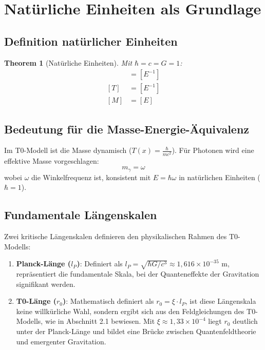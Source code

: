 \documentclass[12pt,a4paper]{article}
\newcommand{\Tfield}{T(x)}
\newtheorem{theorem}{Theorem}[section]
\begin{document}
	\section{Natürliche Einheiten als Grundlage}
	\subsection{Definition natürlicher Einheiten}
	\begin{theorem}[Natürliche Einheiten]
		Mit \(\hbar = c = G = 1\):
		\begin{align}
			[L] &= [E^{-1}] \\
			[T] &= [E^{-1}] \\
			[M] &= [E]
		\end{align}
	\end{theorem}
	
	\subsection{Bedeutung für die Masse-Energie-Äquivalenz}
	Im T0-Modell ist die Masse dynamisch (\(\Tfield = \frac{\hbar}{m c^2}\)). Für Photonen wird eine effektive Masse vorgeschlagen:
	\begin{equation}
		m_\gamma = \omega
	\end{equation}
	wobei \(\omega\) die Winkelfrequenz ist, konsistent mit \(E = \hbar \omega\) in natürlichen Einheiten (\(\hbar = 1\)).
	
	\subsection{Fundamentale Längenskalen}
	
	Zwei kritische Längenskalen definieren den physikalischen Rahmen des T0-Modells:
	
	\begin{enumerate}
		\item \textbf{Planck-Länge (\(l_P\))}: Definiert als \(l_P = \sqrt{\hbar G/c^3} \approx 1,616 \times 10^{-35}\) m, repräsentiert die fundamentale Skala, bei der Quanteneffekte der Gravitation signifikant werden.
		
		\item \textbf{T0-Länge (\(r_0\))}: Mathematisch definiert als \(r_0 = \xi \cdot l_P\), ist diese Längenskala keine willkürliche Wahl, sondern ergibt sich aus den Feldgleichungen des T0-Modells, wie in Abschnitt 2.1 bewiesen. Mit \(\xi \approx 1,33 \times 10^{-4}\) liegt \(r_0\) deutlich unter der Planck-Länge und bildet eine Brücke zwischen Quantenfeldtheorie und emergenter Gravitation.
	\end{enumerate}
	
\end{document}
